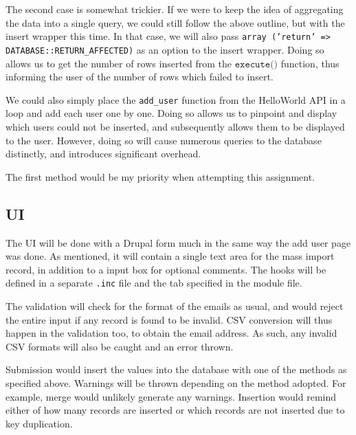 \documentclass[12pt]{article}
\begin{document}
The second case is somewhat trickier. If we were to keep the idea of aggregating the data into a single query, we could still follow the above outline, but with the insert wrapper this time. In that case, we will also pass \texttt{array\,('return' => DATABASE::RETURN\_AFFECTED)} as an option to the insert wrapper. Doing so allows us to get the number of rows inserted from the $\texttt{execute()}$ function, thus informing the user of the number of rows which failed to insert.

We could also simply place the \texttt{add\_user} function from the HelloWorld API in a loop and add each user one by one. Doing so allows us to pinpoint and display which users could not be inserted, and subsequently allows them to be displayed to the user. However, doing so will cause numerous queries to the database distinctly, and introduces significant overhead.

The first method would be my priority when attempting this assignment.

\subsection*{UI}

The UI will be done with a Drupal form much in the same way the add user page was done. As mentioned, it will contain a single text area for the mass import record, in addition to a input box for optional comments. The hooks will be defined in a separate \texttt{.inc} file and the tab specified in the module file.

The validation will check for the format of the emails as usual, and would reject the entire input if any record is found to be invalid. CSV conversion will thus happen in the validation too, to obtain the email address. As such, any invalid CSV formats will also be caught and an error thrown.

Submission would insert the values into the database with one of the methods as specified above. Warnings will be thrown depending on the method adopted. For example, merge would unlikely generate any warnings. Insertion would remind either of how many records are inserted or which records are not inserted due to key duplication.
\end{document}
